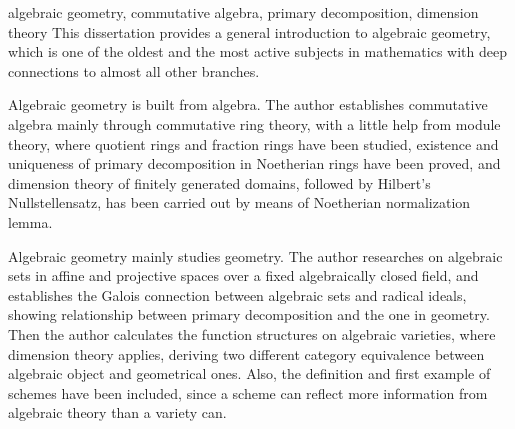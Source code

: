 

\begin{abstract}{代数几何, 交换代数, 准素分解, 维数理论}
  代数几何历史悠久而又充满活力, 与其它数学分支有着深刻的联系, 是一门重要的学科. 代数几何的理论根基在于代数. 本文从基本定义开始建立了以环论为主模论为辅的交换代数理论, 研究了商环与分式环的基本性质, 证明了Noether环上准素分解的存在性及其满足的唯一性, 以域论为基础利用Noether正规化引理证明了域的有限生成整环上的维数定理和Hilbert零点定理.

  代数几何的研究对象在于几何. 本文研究了固定代数闭域上的仿射与射影空间中的代数集, 建立了根式理想与代数集之间的对应, 从而将准素分解理论与几何相联系. 本文还讨论了代数簇上的函数结构, 以此将维数理论应用到几何中, 并证明了两组代数范畴与几何范畴的等价. 最后本文简要介绍了概形的概念, 其相比于代数簇能更完整地体现代数所提供的信息.
\end{abstract}

\begin{abstract*}{algebraic geometry, commutative algebra, primary decomposition, dimension theory}
  This dissertation provides a general introduction to algebraic geometry, which is one of the oldest and the most active subjects in mathematics with deep connections to almost all other branches.

  Algebraic geometry is built from algebra. The author establishes commutative algebra mainly through commutative ring theory, with a little help from module theory, where quotient rings and fraction rings have been studied, existence and uniqueness of primary decomposition in Noetherian rings have been proved, and dimension theory of finitely generated domains, followed by Hilbert's Nullstellensatz, has been carried out by means of Noetherian normalization lemma.

  Algebraic geometry mainly studies geometry. The author researches on algebraic sets in affine and projective spaces over a fixed algebraically closed field, and establishes the Galois connection between algebraic sets and radical ideals, showing relationship between primary decomposition and the one in geometry. Then the author calculates the function structures on algebraic varieties, where dimension theory applies, deriving two different category equivalence between algebraic object and geometrical ones. Also, the definition and first example of schemes have been included, since a scheme can reflect more information from algebraic theory than a variety can.
\end{abstract*}
